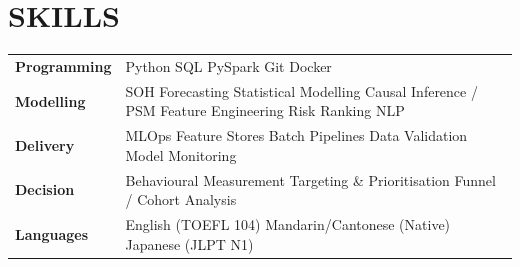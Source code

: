 \documentclass[a4paper,10pt]{article}
\begin{document}
\section{SKILLS}
\begin{tabular}{@{}p{2.5cm}p{14.5cm}@{}}
\textbf{Programming} & Python \textperiodcentered{} SQL \textperiodcentered{} PySpark \textperiodcentered{} Git \textperiodcentered{} Docker \\[0.5pt]
\textbf{Modelling} & SOH Forecasting \textperiodcentered{} Statistical Modelling \textperiodcentered{} Causal Inference / PSM \textperiodcentered{} Feature Engineering \textperiodcentered{} Risk Ranking \textperiodcentered{} NLP \\[0.5pt]
\textbf{Delivery} & MLOps \textperiodcentered{} Feature Stores \textperiodcentered{} Batch Pipelines \textperiodcentered{} Data Validation \textperiodcentered{} Model Monitoring \\[0.5pt]
\textbf{Decision} & Behavioural Measurement \textperiodcentered{} Targeting \& Prioritisation \textperiodcentered{} Funnel / Cohort Analysis \\[0.5pt]
\textbf{Languages} & English (TOEFL 104) \textperiodcentered{} Mandarin/Cantonese (Native) \textperiodcentered{} Japanese (JLPT N1) \\
\end{tabular}
\end{document}
